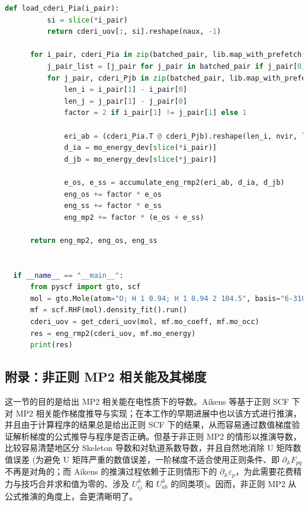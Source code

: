 \begin{lstlisting}[language=Python]
      def load_cderi_Pia(i_pair):
          si = slice(*i_pair)
          return cderi_uov[:, si].reshape(naux, -1)
  
      for i_pair, cderi_Pia in zip(batched_pair, lib.map_with_prefetch(load_cderi_Pia, batched_pair)):
          j_pair_list = [j_pair for j_pair in batched_pair if j_pair[0] <= i_pair[0]]
          for j_pair, cderi_Pjb in zip(batched_pair, lib.map_with_prefetch(load_cderi_Pia, j_pair_list)):
              len_i = i_pair[1] - i_pair[0]
              len_j = j_pair[1] - j_pair[0]
              factor = 2 if i_pair[1] != j_pair[1] else 1
  
              eri_ab = (cderi_Pia.T @ cderi_Pjb).reshape(len_i, nvir, len_j, nvir)
              d_ia = mo_energy_dev[slice(*i_pair)]
              d_jb = mo_energy_dev[slice(*j_pair)]
  
              e_os, e_ss = accumulate_eng_rmp2(eri_ab, d_ia, d_jb)
              eng_os += factor * e_os
              eng_ss += factor * e_ss
              eng_mp2 += factor * (e_os + e_ss)
      
      return eng_mp2, eng_os, eng_ss
  
  
  if __name__ == "__main__":
      from pyscf import gto, scf
      mol = gto.Mole(atom="O; H 1 0.94; H 1 0.94 2 104.5", basis="6-31G").build()
      mf = scf.RHF(mol).density_fit().run()
      cderi_uov = get_cderi_uov(mol, mf.mo_coeff, mf.mo_occ)
      res = eng_rmp2(cderi_uov, mf.mo_energy)
      print(res)  
\end{lstlisting}

\subsection{附录：非正则 MP2 相关能及其梯度}
\label{sec.3.non-canonical-mp2-gradient}

这一节的目的是给出 MP2 相关能在电性质下的导数。Aikens 等基于正则 SCF 下对 MP2 相关能作梯度推导与实现\cite{Aikens-Gordon.TCA.2003}；在本工作的早期进展中也以该方式进行推演，并且由于计算程序的结果总是给出正则 SCF 下的结果，从而容易通过数值梯度验证解析梯度的公式推导与程序是否正确。但基于非正则 MP2 的情形以推演导数，比较容易清楚地区分 Skeleton 导数和对轨道系数导数，并且自然地消除 U 矩阵数值误差 (为避免 U 矩阵严重的数值误差，一阶梯度不适合使用正则条件、即 $\partial_\mathbb{A} F_{pq}$ 不再是对角的；而 Aikens 的推演过程依赖于正则情形下的 $\partial_\mathbb{A} \varepsilon_p$，为此需要花费精力与技巧合并求和值为零的、涉及 $U_{ij}^\mathbb{A}$ 和 $U_{ab}^\mathbb{A}$ 的同类项)。因而，非正则 MP2 从公式推演的角度上，会更清晰明了。

